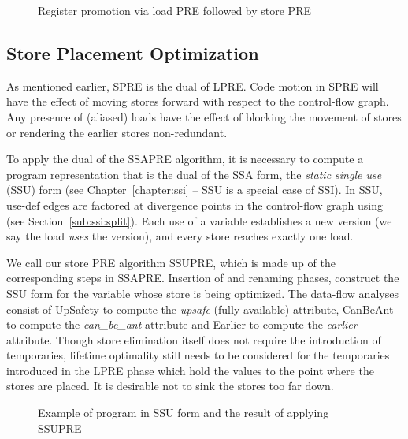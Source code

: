 \begin{figure}
\centering
\hfill
{}\hfill
{}
\caption{Register promotion via load PRE followed by store PRE}
\label{fig:promotion-example}
\end{figure}

\subsection{Store Placement Optimization}
As mentioned earlier, SPRE is the dual of LPRE. 
Code motion in SPRE will have the effect of moving stores forward with respect to the control-flow graph. 
Any presence of (aliased) loads have the effect of blocking the movement of stores or rendering the earlier stores non-redundant.

To apply the dual of the SSAPRE algorithm, it is necessary to compute a program representation that is the dual of the SSA form, the \emph{static single use} (SSU) form (see Chapter~\ref{chapter:ssi} -- SSU is a special case of SSI). 
In SSU, use-def edges are factored at divergence points in the control-flow graph using \sigmafuns (see Section~\ref{sub:ssi:split}).
Each use of a variable establishes a new version (we say the load \emph{uses} the version), and every store reaches exactly one load. 

We call our store PRE algorithm SSUPRE, which is made up of the corresponding steps in SSAPRE. 
Insertion of \sigmafuns and renaming phases, construct the SSU form for the variable whose store is being optimized. 
The data-flow analyses consist of UpSafety to compute the \emph{upsafe} (fully available) attribute, CanBeAnt to compute the \emph{can\_be\_ant} attribute and Earlier to compute the \emph{earlier} attribute. 
Though store elimination itself does not require the introduction of temporaries, lifetime optimality still needs to be considered for the temporaries introduced in the LPRE phase which hold the values to the point where the stores are placed. 
It is desirable not to sink the stores too far down.

\begin{figure}
\centering
\hfill
{}\hfill
{}
\caption{Example of program in SSU form and the result of applying SSUPRE}
\label{fig:ssupre}
\end{figure}

